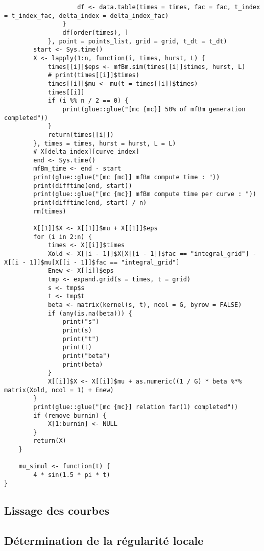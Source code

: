 \begin{verbatim}
                    df <- data.table(times = times, fac = fac, t_index = t_index_fac, delta_index = delta_index_fac)
                }
                df[order(times), ]
            }, point = points_list, grid = grid, t_dt = t_dt)
        start <- Sys.time()
        X <- lapply(1:n, function(i, times, hurst, L) {
            times[[i]]$eps <- mfBm.sim(times[[i]]$times, hurst, L)
            # print(times[[i]]$times)
            times[[i]]$mu <- mu(t = times[[i]]$times)
            times[[i]]
            if (i %% n / 2 == 0) {
                print(glue::glue("[mc {mc}] 50% of mfBm generation completed"))
            }
            return(times[[i]])
        }, times = times, hurst = hurst, L = L)
        # X[delta_index][curve_index]
        end <- Sys.time()
        mfBm_time <- end - start
        print(glue::glue("[mc {mc}] mfBm compute time : "))
        print(difftime(end, start))
        print(glue::glue("[mc {mc}] mfBm compute time per curve : "))
        print(difftime(end, start) / n)
        rm(times)

        X[[1]]$X <- X[[1]]$mu + X[[1]]$eps
        for (i in 2:n) {
            times <- X[[i]]$times
            Xold <- X[[i - 1]]$X[X[[i - 1]]$fac == "integral_grid"] - X[[i - 1]]$mu[X[[i - 1]]$fac == "integral_grid"]
            Enew <- X[[i]]$eps
            tmp <- expand.grid(s = times, t = grid)
            s <- tmp$s
            t <- tmp$t
            beta <- matrix(kernel(s, t), ncol = G, byrow = FALSE)
            if (any(is.na(beta))) {
                print("s")
                print(s)
                print("t")
                print(t)
                print("beta")
                print(beta)
            }
            X[[i]]$X <- X[[i]]$mu + as.numeric((1 / G) * beta %*% matrix(Xold, ncol = 1) + Enew)
        }
        print(glue::glue("[mc {mc}] relation far(1) completed"))
        if (remove_burnin) {
            X[1:burnin] <- NULL
        }
        return(X)
    }

    mu_simul <- function(t) {
        4 * sin(1.5 * pi * t)
}
    \end{verbatim}

	\subsection{Lissage des courbes}


	\subsection{Détermination de la régularité locale}


